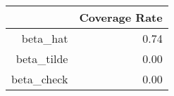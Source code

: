 \begin{table}[ht]
\centering
\begin{tabular}{rr}
  \hline
 & Coverage Rate \\ 
  \hline
beta\_hat & 0.74 \\ 
  beta\_tilde & 0.00 \\ 
  beta\_check & 0.00 \\ 
   \hline
\end{tabular}
\end{table}

